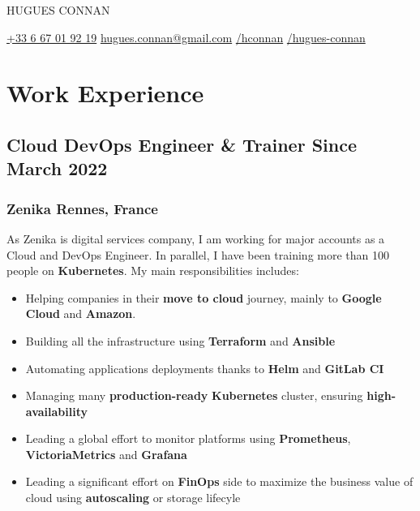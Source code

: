 \documentclass[11pt]{article}
\newcommand{\rside}[1]{
  \hfill {\normalfont\color{gray} #1}%
}
\begin{document}

\begin{center}
  {
    \fontsize{36}{12} 
    \selectfont
    \color{accent} 
    HUGUES CONNAN %
  } \\ \medskip


  \href{tel:+33667019219}{{\color{accent}{\faPhone}} +33 6 67 01 92 19} \quad
  \href{mailto:hugues.connan@gmail.com}{{\color{accent}{\faEnvelope}} hugues.connan@gmail.com} \quad 
  \href{https://github.com/hconnan}{{\color{accent}{\faGithub}} /hconnan} \quad
  \href{https://www.linkedin.com/in/hugues-connan}{{\color{accent}{\faLinkedin}} /hugues-connan} \quad
\end{center}


\section{Work Experience}
\subsection{Cloud DevOps Engineer \& Trainer \rside{Since March 2022}}
\subsubsection{Zenika \rside{Rennes, France}}

\begin{justify}
  As Zenika is digital services company, I am working for major accounts as a Cloud and DevOps Engineer.
  In parallel, I have been training more than 100 people on \textbf{Kubernetes}. My main responsibilities includes:
\end{justify}
\vspace{-2mm}

\begin{itemize}
  \item Helping companies in their \textbf{move to cloud} journey, mainly to \textbf{Google Cloud} and \textbf{Amazon}.
  \item Building all the infrastructure using \textbf{Terraform} and \textbf{Ansible}
  \item Automating applications deployments thanks to \textbf{Helm} and \textbf{GitLab CI}
  \item Managing many \textbf{production-ready} \textbf{Kubernetes} cluster, ensuring \textbf{high-availability}
  \item Leading a global effort to monitor platforms using \textbf{Prometheus}, \textbf{VictoriaMetrics} and \textbf{Grafana}
  \item Leading a significant effort on \textbf{FinOps} side to maximize the business value of cloud using \textbf{autoscaling} or storage lifecyle 
\end{itemize}
\end{document}
